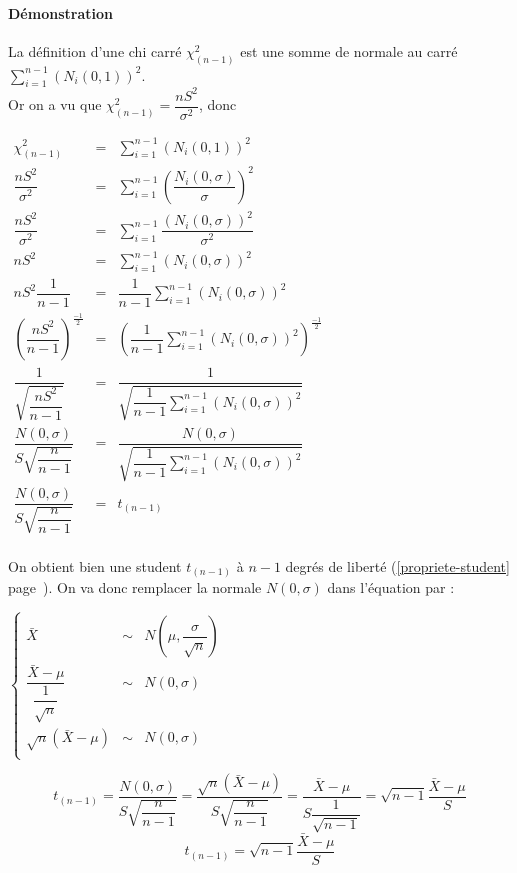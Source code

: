 \paragraph{Démonstration} La définition d'une chi carré $\chi^2_{(n-1)}$ est une somme de normale au carré $\displaystyle\sum_{i=1}^{n-1} (N_i(0,1))^2$.\\Or on a vu que $\chi^2_{(n-1)} = \dfrac{nS^2}{\sigma^2}$, donc
\begin{center}
$\begin{array}{LCL}
\chi^2_{(n-1)} &=& \sum_{i=1}^{n-1} (N_i(0,1))^2\\
\dfrac{nS^2}{\sigma^2} &=& \sum_{i=1}^{n-1} \left(\dfrac{N_i(0,\sigma)}{\sigma}\right)^2\\
\dfrac{nS^2}{\sigma^2} &=& \sum_{i=1}^{n-1} \dfrac{(N_i(0,\sigma))^2}{\sigma^2}\\
nS^2 &=& \sum_{i=1}^{n-1} (N_i(0,\sigma))^2\\
nS^2 \dfrac{1}{n-1}&=& \dfrac{1}{n-1} \sum_{i=1}^{n-1} (N_i(0,\sigma))^2\\
\left(\dfrac{nS^2}{n-1}\right)^{\frac{-1}{2}} &=& \left(\dfrac{1}{n-1} \sum_{i=1}^{n-1} (N_i(0,\sigma))^2 \right)^{\frac{-1}{2}}\\
\dfrac{1}{\sqrt{\dfrac{nS^2}{n-1}}} &=& \dfrac{1}{\sqrt{\dfrac{1}{n-1} \displaystyle\sum_{i=1}^{n-1} (N_i(0,\sigma))^2}}\\
\dfrac{N(0,\sigma)}{S\sqrt{\dfrac{n}{n-1}}} &=& \dfrac{N(0,\sigma)}{\sqrt{\dfrac{1}{n-1} \displaystyle\sum_{i=1}^{n-1} (N_i(0,\sigma))^2}}\\
\dfrac{N(0,\sigma)}{S\sqrt{\dfrac{n}{n-1}}} &=& t_{(n-1)}\\
\end{array}$
\end{center}
On obtient bien une student $t_{(n-1)}$ à $n-1$ degrés de liberté (\ref{propriete-student} page~\pageref{propriete-student}). On va donc remplacer la normale $N(0,\sigma)$ dans l'équation par :
\begin{center}
$\left\{\begin{array}{LCLL}
\bar{X} &\sim& N\left(\mu,\dfrac{\sigma}{\sqrt{n}}\right)\\
\dfrac{\bar{X}-\mu}{\dfrac{1}{\sqrt{n}}} &\sim& N(0,\sigma)\\
\sqrt{n}\left(\bar{X}-\mu\right) &\sim& N(0,\sigma)\\
\end{array}\right.$
\end{center}
$$t_{(n-1)} = \dfrac{N(0,\sigma)}{S\sqrt{\dfrac{n}{n-1}}} = \dfrac{\sqrt{n}\left(\bar{X}-\mu\right)}{S\sqrt{\dfrac{n}{n-1}}} = \dfrac{\bar{X}-\mu}{S\dfrac{1}{\sqrt{n-1}}} = \sqrt{n-1}\dfrac{\bar{X}-\mu}{S}$$
$$\boxed{t_{(n-1)} = \sqrt{n-1}\dfrac{\bar{X}-\mu}{S}}$$